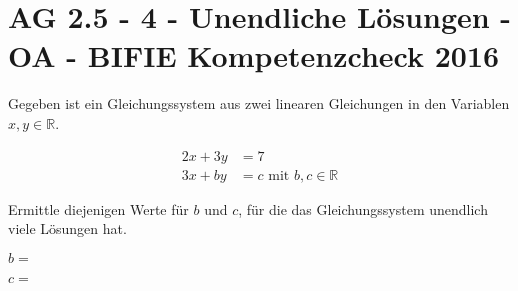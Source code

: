 \section{AG 2.5 - 4 - Unendliche Lösungen - OA - BIFIE Kompetenzcheck 2016}

\begin{beispiel}[AG 2.5]{1} %
				Gegeben ist ein Gleichungssystem aus zwei linearen Gleichungen in den Variablen $x,y\in\mathbb{R}$.

\begin{align}
2x+3y &=7\\
3x+by &=c \text{ mit } b,c\in\mathbb{R}
\end{align}

Ermittle diejenigen Werte für $b$ und $c$, für die das Gleichungssystem unendlich viele Lösungen hat.
\leer

$b=$ 
\leer

$c=$ 
\end{beispiel}	